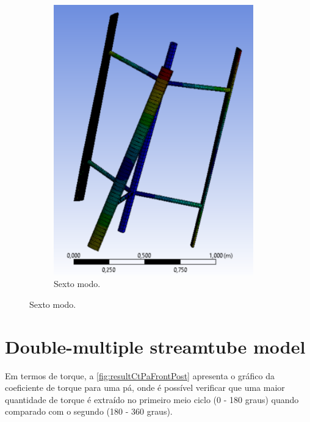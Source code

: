 \begin{figure}
\begin{subfigure}{0.5\textwidth}
		\includegraphics[width=0.95\textwidth]{figuras/resultmodalmacico6.pdf}
		\caption{Sexto modo.}
		\label{subfig:resultmodomacicomodo6}
	\end{subfigure}		
\end{figure}


\section{Double-multiple streamtube model}
\label{sec:resultdmsm}

Em termos de torque, a \autoref{fig:resultCtPaFrontPost} apresenta o gráfico da coeficiente de torque para uma pá, onde é possível verificar que uma maior quantidade de torque é extraído no primeiro meio ciclo (0 - 180 graus) quando comparado com o segundo (180 - 360 graus).

